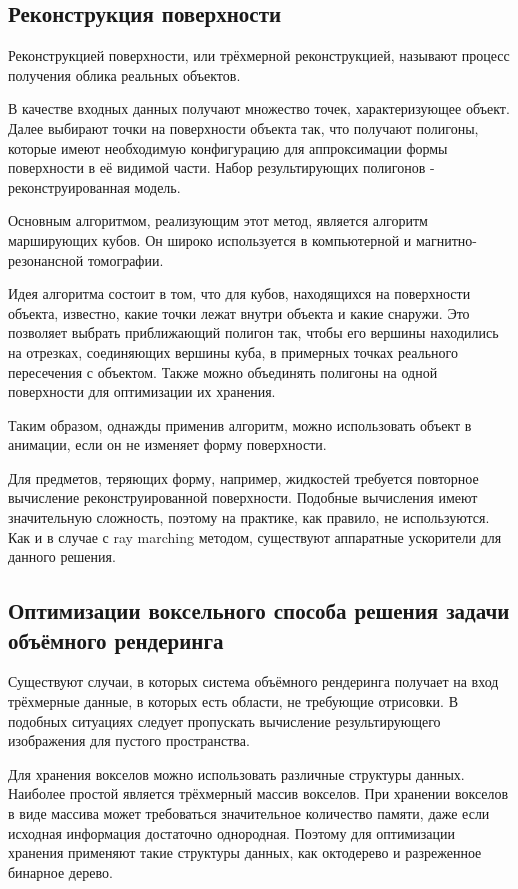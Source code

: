 \subsection{Реконструкция поверхности}

Реконструкцией поверхности, или трёхмерной реконструкцией, называют процесс
получения облика реальных объектов.

В качестве входных данных получают множество точек, характеризующее объект.
Далее выбирают точки на поверхности объекта так, что получают полигоны, которые
имеют необходимую конфигурацию для аппроксимации формы поверхности в её видимой части.
Набор результирующих полигонов - реконструированная модель.

Основным алгоритмом, реализующим этот метод, является алгоритм марширующих кубов.
Он широко используется в компьютерной и магнитно-резонансной томографии\cite{site:marchingcubes}.

Идея алгоритма состоит в том, что для кубов, находящихся на поверхности объекта, известно,
какие точки лежат внутри объекта и какие снаружи. Это позволяет выбрать
приближающий полигон так, чтобы его вершины находились на отрезках, соединяющих вершины куба,
в примерных точках реального пересечения с объектом. Также можно объединять полигоны на одной поверхности
для оптимизации их хранения.

Таким образом, однажды применив алгоритм, можно использовать объект в анимации, если
он не изменяет форму поверхности.

Для предметов, теряющих форму, например, жидкостей требуется повторное вычисление
реконструированной поверхности. Подобные вычисления имеют значительную сложность,
поэтому на практике, как правило, не используются\cite{book:ash}. Как и в случае
с ray marching методом, существуют аппаратные ускорители для данного решения\cite{site:gvdb}.

\subsection{Оптимизации воксельного способа решения задачи объёмного рендеринга}

Существуют случаи, в которых система объёмного рендеринга получает на вход трёхмерные данные, в
 которых есть области, не требующие отрисовки. В подобных ситуациях следует пропускать вычисление
 результирующего изображения для пустого пространства\cite{article:asvo}.

Для хранения вокселов можно использовать различные структуры данных. Наиболее простой является
трёхмерный массив вокселов. При хранении вокселов в виде массива может требоваться значительное
количество памяти, даже если исходная информация достаточно однородная.
Поэтому для оптимизации хранения применяют такие структуры данных, как октодерево и разреженное бинарное дерево\cite{article:asvo}.

